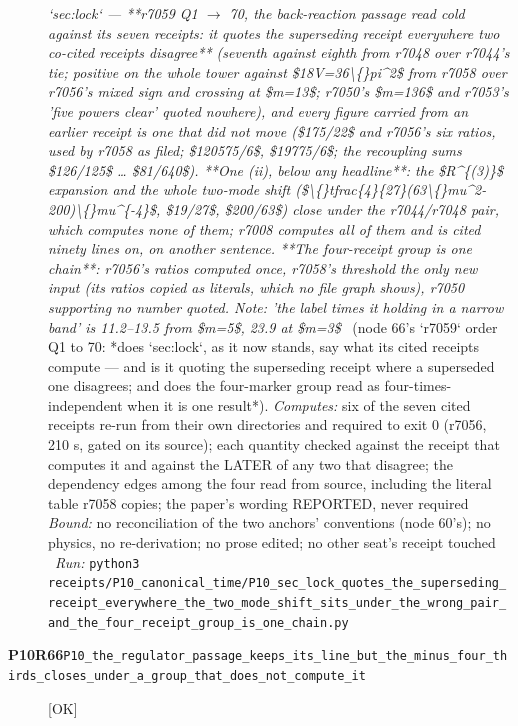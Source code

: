 \begin{description}
\textit{`sec:lock` --- **r7059 Q1 \ensuremath{\to} 70, the back-reaction passage read cold against its seven receipts: it quotes the superseding receipt everywhere two co-cited receipts disagree** (seventh against eighth from r7048 over r7044's tie; positive on the whole tower against \$18V=36\textbackslash\{\}pi\textasciicircum{}2\$ from r7058 over r7056's mixed sign and crossing at \$m=13\$; r7050's \$m=136\$ and r7053's 'five powers clear' quoted nowhere), and every figure carried from an earlier receipt is one that did not move (\$175/22\$ and r7056's six ratios, used by r7058 as filed; \$120575/6\$, \$19775/6\$; the recoupling sums \$126/125\$ \ldots{} \$81/640\$). **One (ii), below any headline**: the \$R\textasciicircum{}\{(3)\}\$ expansion and the whole two-mode shift (\$\textbackslash\{\}tfrac\{4\}\{27\}(63\textbackslash\{\}mu\textasciicircum{}2-200)\textbackslash\{\}mu\textasciicircum{}\{-4\}\$, \$19/27\$, \$200/63\$) close under the r7044/r7048 pair, which computes none of them; r7008 computes all of them and is cited ninety lines on, on another sentence. **The four-receipt group is one chain**: r7056's ratios computed once, r7058's threshold the only new input (its ratios copied as literals, which no file graph shows), r7050 supporting no number quoted. Note: 'the label times it holding in a narrow band' is 11.2--13.5 from \$m=5\$, 23.9 at \$m=3\$} \ (node 66's `r7059` order Q1 to 70: *does `sec:lock`, as it now stands, say what its cited receipts compute --- and is it quoting the superseding receipt where a superseded one disagrees; and does the four-marker group read as four-times-independent when it is one result*). 
\emph{Computes:} six of the seven cited receipts re-run from their own directories and required to exit 0 (r7056, 210 s, gated on its source); each quantity checked against the receipt that computes it and against the LATER of any two that disagree; the dependency edges among the four read from source, including the literal table r7058 copies; the paper's wording REPORTED, never required
 \emph{Bound:}  no reconciliation of the two anchors' conventions (node 60's); no physics, no re-derivation; no prose edited; no other seat's receipt touched
\ \emph{Run:} \texttt{python3 receipts/P10\_canonical\_time/P10\_sec\_lock\_quotes\_the\_superseding\_receipt\_everywhere\_the\_two\_mode\_shift\_sits\_under\_the\_wrong\_pair\_and\_the\_four\_receipt\_group\_is\_one\_chain.py}
\item[\rcptlabel{P10_the_regulator_passage_keeps_its_line_but_the_minus_four_thirds_closes_under_a_group_that_does_not_compute_it}{P10R66}\textbf{P10R66}\quad\texttt{P10\_the\_regulator\_passage\_keeps\_its\_line\_but\_the\_minus\_four\_thirds\_closes\_under\_a\_group\_that\_does\_not\_compute\_it}]\hfill\textsf{[OK]}\\

\end{description}
